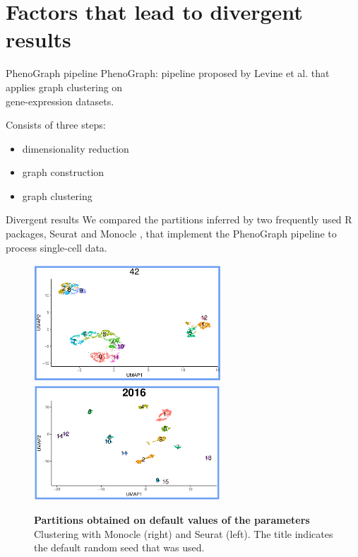 \section{Factors that lead to divergent results}

\begin{frame}{PhenoGraph pipeline}
    PhenoGraph: pipeline proposed by Levine et al. \cite{Levine2015} that applies graph clustering on \\ gene-expression datasets.

    \bigskip

    Consists of three steps:
    \begin{itemize}[<+->]
        \item dimensionality reduction
        \item graph construction
        \item graph clustering
    \end{itemize}
    
\end{frame}

\begin{frame}{Divergent results}
    We compared the partitions inferred by two frequently used R packages, Seurat \cite{Hao2021} and Monocle \cite{Cao2019}, that implement the PhenoGraph pipeline to process single-cell data.

    \begin{figure}[H]
    \centering
    \includegraphics[width=7cm]{images/ch2/2_S1.png}
    \includegraphics[width=7cm]{images/ch2/2_M1.png}
    \caption{\textbf{Partitions obtained on default values of the parameters} Clustering with Monocle (right) and Seurat (left). The title indicates the default random seed that was used.}
\end{figure}
\end{frame}

